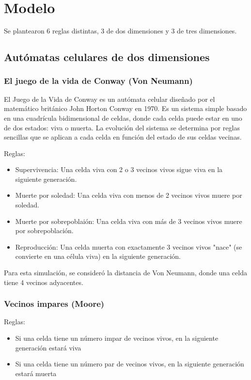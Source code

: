 \section{Modelo}
\label{sec:modelo}
Se plantearon 6 reglas distintas, 3 de dos dimensiones y 3 de tres  dimensiones.

\subsection{Autómatas celulares de dos dimensiones}
\label{subsec:2d}

\subsubsection{El juego de la vida de Conway (Von Neumann)}

El Juego de la Vida de Conway es un autómata celular diseñado por el matemático británico John Horton Conway en 1970.
Es un sistema simple basado en una cuadrícula bidimensional de celdas, donde cada celda puede estar en uno de dos estados: viva o muerta.
La evolución del sistema se determina por reglas sencillas que se aplican a cada celda en función del estado de sus celdas vecinas.

Reglas:
\begin{itemize}
    \item Supervivencia: Una celda viva con 2 o 3 vecinos vivos sigue viva en la siguiente generación.

    \item Muerte por soledad: Una celda viva con menos de 2 vecinos vivos muere por soledad.

    \item Muerte por sobrepoblaión: Una celda viva con más de 3 vecinos vivos muere por sobrepoblación.

    \item Reproducción: Una celda muerta con exactamente 3 vecinos vivos "nace" (se convierte en una célula viva) en la siguiente generación.
\end{itemize}

Para esta simulación, se consideró la distancia de Von Neumann, donde una celda tiene 4 vecinos adyacentes.

\subsubsection{Vecinos impares (Moore)}

Reglas:
\begin{itemize}
    \item Si una celda tiene un número impar de vecinos vivos, en la siguiente generación estará viva
    \item Si una celda tiene un número par de vecinos vivos, en la siguiente generación estará muerta
\end{itemize}


